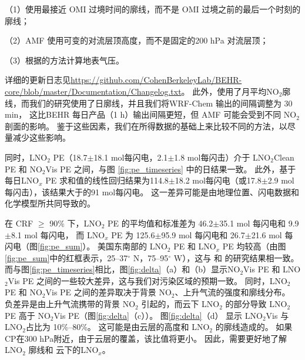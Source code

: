（1）使用最接近 OMI 过境时间的廓线，而不是 OMI 过境之前的最后一个时刻的廓线；

（2）AMF 使用可变的对流层顶高度，而不是固定的200 hPa 对流层顶；

（3）根据\citet{Zhou.2009}的方法计算地表气压。

详细的更新日志见\url{https://github.com/CohenBerkeleyLab/BEHR-core/blob/master/Documentation/Changelog.txt}。
此外，\citet{Lapierre.2020}使用了月平均NO$_2$廓线，而我们的研究使用了日廓线，并且我们将WRF-Chem 输出的间隔调整为 30 min，
这比BEHR 每日产品（1 h）输出间隔更短，但 AMF 可能会受到不同 NO$_2$ 剖面的影响。
鉴于这些因素，我们在所得数据的基础上来比较不同的方法，以尽量减少这些影响。

同时，LNO$_2$ PE（18.7$\pm$18.1 mol每闪电，2.1$\pm$1.8 mol每闪击）介于 LNO$_2$Clean PE 和 NO$_2$Vis PE 之间，与图 \ref{fig:pe_timeseries} 中的日结果一致。
此外，基于每日LNO$_x$ PE 求和值的线性回归结果为114.8$\pm$18.2 mol每闪电（或17.8$\pm$2.9 mol每闪击），该结果大于\citet{Pickering.2016}的91 mol每闪电。
这一差异可能是由地理位置、闪电数据和化学模型所共同导致的。

在 CRF $\geq$ 90\% 下，LNO$_2$ PE 的平均值和标准差为 46.2$\pm$35.1 mol 每闪电和 9.9$\pm$8.1 mol 每闪电，
而 LNO$_x$ PE 为 125.6$\pm$95.9 mol 每闪电和 26.7$\pm$21.6 mol 每闪电（图\ref{fig:pe_sum}）。
美国东南部的 LNO$_2$ PE 和 LNO$_x$ PE 均较高（由图\ref{fig:pe_sum}中的红框表示，25--37$^{\circ}$ N，75--95$^{\circ}$ W），这与\citet{Lapierre.2020} 和 \citet{Bucsela.2019}的研究结果相一致。
而与图\ref{fig:pe_timeseries}相比，图\ref{fig:delta}（a）和（b）显示NO$_2$Vis PE 和 LNO$_2$Vis PE 之间的一些较大差异，这与我们对污染区域的预期一致。
同时，LNO$_2$ PE 和 NO$_2$Vis PE 之间的差异取决于背景 NO$_2$、上升气流的强度和廓线分布。
负差异是由上升气流携带的背景 NO$_2$ 引起的，而云下 LNO$_2$ 的部分导致 LNO$_2$ PE 高于 NO$_2$Vis PE（图\ref{fig:delta}（c））。
图\ref{fig:delta}（d） 显示 LNO$_2$Vis 与 LNO$_2$占比为 10\%--80\%。
这可能是由云层的高度和 LNO$_2$ 的廓线造成的。
如果CP在300 hPa附近，由于云层的覆盖，该比值将更小。
因此，需要更好地了解LNO$_2$ 廓线和 云下的LNO$_x$。


